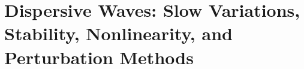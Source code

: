 \chapter{Dispersive Waves: Slow Variations, Stability, Nonlinearity, and Perturbation Methods}
\label{ch:dispersive}











